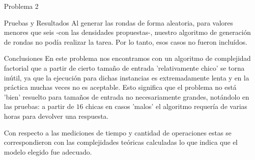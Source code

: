 \begin{section}{Problema 2}
\begin{subsection}{Pruebas y Resultados}
		Al generar las rondas de forma aleatoria, para valores menores que seis -con las densidades propuestas-, nuestro algoritmo de generación de rondas no podía realizar la tarea. Por lo tanto, esos casos no fueron incluídos.
	\end{subsection}
	\begin{subsection}{Conclusiones}
			En este problema nos encontramos con un algoritmo de complejidad factorial que a partir de cierto tamaño de entrada 'relativamente chico' se torna inútil, ya que la ejecución para dichas instancias es extremadamente lenta y en la práctica muchas veces no es aceptable. Esto significa que el problema no está 'bien' resuelto para tamaños de entrada no necesariamente grandes, notándolo en las pruebas: a partir de $16$ chicas en casos 'malos' el algoritmo requería de varias horas para devolver una respuesta. 

	Con respecto a las mediciones de tiempo y cantidad de operaciones estas se correspondieron con las complejidades teóricas calculadas lo que indica que el modelo elegido fue adecuado.
	\end{subsection}
\end{section}
